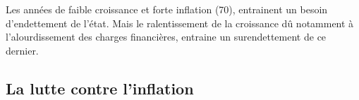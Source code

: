 Les années de faible croissance et forte inflation (70), entrainent un besoin d'endettement de l'état. Mais le ralentissement de la croissance dû notamment à 
l'alourdissement des charges financières, entraine un surendettement de ce dernier.

\subsection{La lutte contre l'inflation} %
\label{sub:la_lutte_contre_l_inflation}









